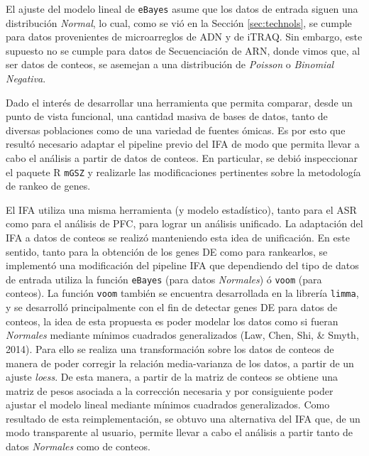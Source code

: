 \documentclass[12pt,twoside]{reedthesis}
\begin{document}
\par

El ajuste del modelo lineal de \texttt{eBayes} asume que los datos de entrada siguen una distribución \emph{Normal}, lo cual, como se vió en la Sección \ref{sec:technols}, se cumple para datos provenientes de microarreglos de ADN y de iTRAQ. Sin embargo, este supuesto no se cumple para datos de Secuenciación de ARN, donde vimos que, al ser datos de conteos, se asemejan a una distribución de \emph{Poisson} o \emph{Binomial Negativa}.

\par

Dado el interés de desarrollar una herramienta que permita comparar, desde un punto de vista funcional, una cantidad masiva de bases de datos, tanto de diversas poblaciones como de una variedad de fuentes ómicas. Es por esto que resultó necesario adaptar el pipeline previo del IFA de modo que permita llevar a cabo el análisis a partir de datos de conteos. En particular, se debió inspeccionar el paquete R \texttt{mGSZ} y realizarle las modificaciones pertinentes sobre la metodología de rankeo de genes.

\par

El IFA utiliza una misma herramienta (y modelo estadístico), tanto para el ASR como para el análisis de PFC, para lograr un análisis unificado. La adaptación del IFA a datos de conteos se realizó manteniendo esta idea de unificación. En este sentido, tanto para la obtención de los genes DE como para rankearlos, se implementó una modificación del pipeline IFA que dependiendo del tipo de datos de entrada utiliza la función \texttt{eBayes} (para datos \emph{Normales}) ó \texttt{voom} (para conteos). La función \texttt{voom} también se encuentra desarrollada en la librería \texttt{limma}, y se desarrolló principalmente con el fin de detectar genes DE para datos de conteos, la idea de esta propuesta es poder modelar los datos como si fueran \emph{Normales} mediante mínimos cuadrados generalizados (Law, Chen, Shi, \& Smyth, 2014). Para ello se realiza una transformación sobre los datos de conteos de manera de poder corregir la relación media-varianza de los datos, a partir de un ajuste \emph{loess}. De esta manera, a partir de la matriz de conteos se obtiene una matriz de pesos asociada a la corrección necesaria y por consiguiente poder ajustar el modelo lineal mediante mínimos cuadrados generalizados. Como resultado de esta reimplementación, se obtuvo una alternativa del IFA que, de un modo transparente al usuario, permite llevar a cabo el análisis a partir tanto de datos \emph{Normales} como de conteos.
\end{document}
